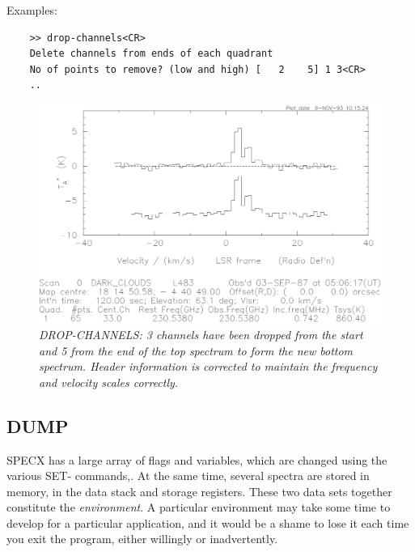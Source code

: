 \documentclass[11pt,twoside]{report}
\begin{document}
Examples:
\begin{verbatim}
    >> drop-channels<CR>
    Delete channels from ends of each quadrant
    No of points to remove? (low and high) [   2    5] 1 3<CR>
    ..
\end{verbatim}

\begin{figure}[htbp]
\begin{center}
\includegraphics[scale=0.65]{drop-ch.ps}
\protect\parbox{5.5in}
{\caption[DROP]
{\sl
DROP-CHANNELS: 3 channels have been dropped from the start and 5 from the
end of the top spectrum to form the new bottom spectrum. Header information
is corrected to maintain the frequency and velocity scales correctly.
\label{DROP}
}
}
\end{center}
\end{figure}

\subsection{DUMP} 

SPECX has a large array of flags  and variables, which are changed
using the various SET- commands,. At the same time, several spectra are stored
in memory, in the data stack  and storage registers.
 These two data sets together constitute
the {\em environment}.  A particular environment may take
some time to develop for a particular application, and it would be a shame to
lose it each time you exit the program, either willingly or inadvertently. 
\end{document}
